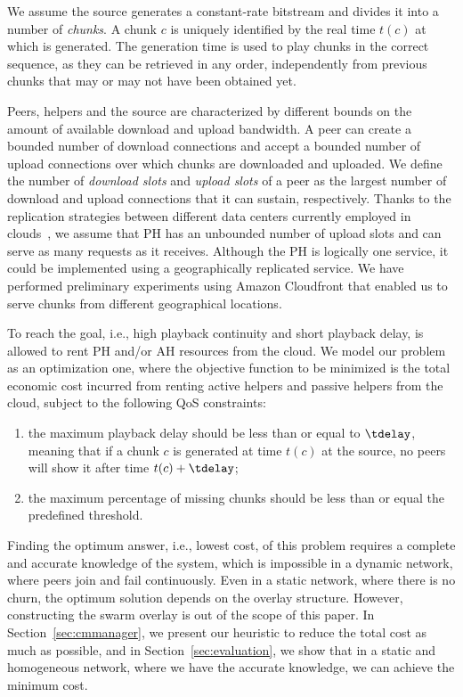 We assume the source generates a constant-rate bitstream and divides it into a
number of \emph{chunks}. A chunk $c$ is uniquely identified by the real time
$t(c)$ at which is generated. The generation time is used to play chunks in
the correct sequence, as they can be retrieved in any order, independently from
previous chunks that may or may not have been obtained yet.

Peers, helpers and the source are characterized by different bounds on the
amount of available download and upload bandwidth. A peer can create a bounded
number of download connections and accept a bounded number of upload
connections over which chunks are downloaded and uploaded. We define the
number of {\em download slots} and {\em upload slots} of a peer as the
largest number of download and upload connections that it can sustain, respectively. 
Thanks to the replication strategies between different data centers currently employed in
clouds~\cite{goel2006data}, we assume that PH has an unbounded number of
upload slots and can serve as many requests as it receives. Although the PH is logically one service, it could be implemented using  a geographically replicated service. We have performed preliminary experiments using Amazon Cloudfront that enabled us to serve chunks from different geographical locations.

To reach the \clive goal, i.e., high playback continuity and short playback delay, \clive is allowed to rent 
PH and/or AH resources from the cloud. 
We model our problem as an optimization one, where the objective function to be minimized is the total economic cost incurred from renting active helpers and passive helpers from the cloud, subject to the following QoS constraints:
\begin{enumerate}
\item the maximum playback delay should be less than or equal to $\tdelay$,
meaning that if a chunk $c$ is generated at time $t(c)$ at the source, no
peers will show it after time $t(c)+\tdelay$;
\item the maximum percentage of missing chunks should be less than or equal the predefined threshold.
\end{enumerate}

Finding the optimum answer, i.e., lowest cost, of this problem requires a complete and accurate knowledge of the system, which is impossible in a dynamic network, where peers join and fail continuously. Even in a static network, where there is no churn, the optimum solution depends on the overlay structure. However, constructing the swarm overlay is out of the scope of this paper. In Section~\ref{sec:cmmanager}, we present our heuristic to reduce the total cost as much as possible, and in Section~\ref{sec:evaluation}, we show that in a static and homogeneous network, where we have the accurate knowledge, we can achieve the minimum cost.

